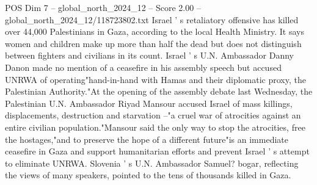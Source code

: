 \begin{textsample}{POS Dim 7 – global\_north\_2024\_12 – Score 2.00 – global\_north\_2024\_12/118723802.txt}
Israel ' s retaliatory offensive has killed over 44,000 Palestinians in Gaza, according to the local Health Ministry.
It says women and children make up more than half the dead but does not distinguish between fighters and civilians in its count.
Israel ' s U.N.
Ambassador Danny Danon made no mention of a ceasefire in his assembly speech but accused UNRWA of operating"hand-in-hand with Hamas and their diplomatic proxy, the Palestinian Authority."At the opening of the assembly debate last Wednesday, the Palestinian U.N.
Ambassador Riyad Mansour accused Israel of mass killings, displacements, destruction and starvation --"a cruel war of atrocities against an entire civilian population."Mansour said the only way to stop the atrocities, free the hostages,"and to preserve the hope of a different future"is an immediate ceasefire in Gaza and support humanitarian efforts and prevent Israel ' s attempt to eliminate UNRWA.
Slovenia ' s U.N.
Ambassador Samuel? bogar, reflecting the views of many speakers, pointed to the tens of thousands killed in Gaza.

\end{textsample}
